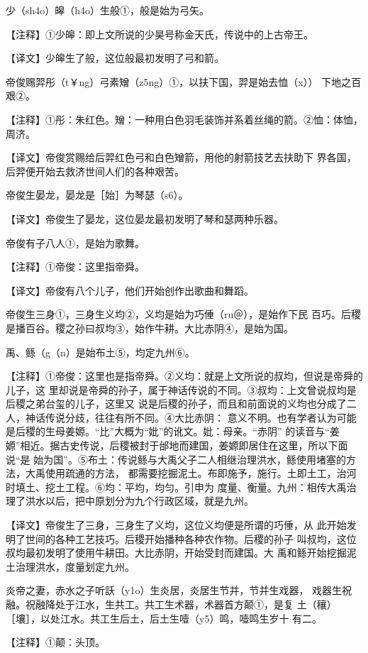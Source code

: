 \documentclass[a4paper,12pt,UTF8,twoside]{ctexbook}
\begin{document}
少（sh4o）皞（h4o）生般①，般是始为弓矢。

【注释】①少皞：即上文所说的少昊号称金天氏，传说中的上古帝王。

【译文】少皞生了般，这位般最初发明了弓和箭。

帝俊赐羿彤（t￥ng）弓素矰（z5ng）①，以扶下国，羿是始去恤（x）） 下地之百艰②。

【注释】①彤：朱红色。矰：一种用白色羽毛装饰并系着丝绳的箭。②恤：体恤，周济。

【译文】帝俊赏赐给后羿红色弓和白色矰箭，用他的射箭技艺去扶助下 界各国，后羿便开始去救济世间人们的各种艰苦。

帝俊生晏龙，晏龙是［始］为琴瑟（s6）。

【译文】帝俊生了晏龙，这位晏龙最初发明了琴和瑟两种乐器。

帝俊有子八人①，是始为歌舞。

【注释】①帝俊：这里指帝舜。

【译文】帝俊有八个儿子，他们开始创作出歌曲和舞蹈。

帝俊生三身①，三身生义均②，义均是始为巧倕（ru＠），是始作下民 百巧。后稷是播百谷。稷之孙曰叔均③，始作牛耕。大比赤阴④，是始为国。

禹、鲧（g（n）是始布土⑤，均定九州⑥。

【注释】①帝俊：这里也是指帝舜。②义均：就是上文所说的叔均，但说是帝舜的儿子，这 里却说是帝舜的孙子，属于神话传说的不同。③叔均：上文曾说叔均是后稷之弟台玺的儿子，这里又 说是后稷的孙子，而且和前面说的义均也分成了二人，神话传说分歧，往往有所不同。④大比赤阴： 意义不明。也有学者认为可能是后稷的生母姜嫄。“比”大概为“妣”的讹文。妣：母亲。“赤阴” 的读音与“姜嫄”相近。据古史传说，后稷被封于邰地而建国，姜嫄即居住在这里，所以下面说“是 始为国”。⑤布土：传说鲧与大禹父子二人相继治理洪水，鲧使用堵塞的方法，大禹使用疏通的方法， 都需要挖掘泥土。布即施予，施行。土即土工，治河时填土、挖土工程。⑥均：平均，均匀。引申为 度量、衡量。九州：相传大禹治理了洪水以后，把中原划分为九个行政区域，就是九州。

【译文】帝俊生了三身，三身生了义均，这位义均便是所谓的巧倕，从 此开始发明了世间的各种工艺技巧。后稷开始播种各种农作物。后稷的孙子 叫叔均，这位叔均最初发明了使用牛耕田。大比赤阴，开始受封而建国。大 禹和鲧开始挖掘泥土治理洪水，度量划定九州。

炎帝之妻，赤水之子听訞（y1o）生炎居，炎居生节并，节并生戏器， 戏器生祝融。祝融降处于江水，生共工。共工生术器，术器首方颠①，是复 土（穰）［壤］，以处江水。共工生后土，后土生噎（y5）鸣，噎鸣生岁十 有二。

【注释】①颠：头顶。
\end{document}
